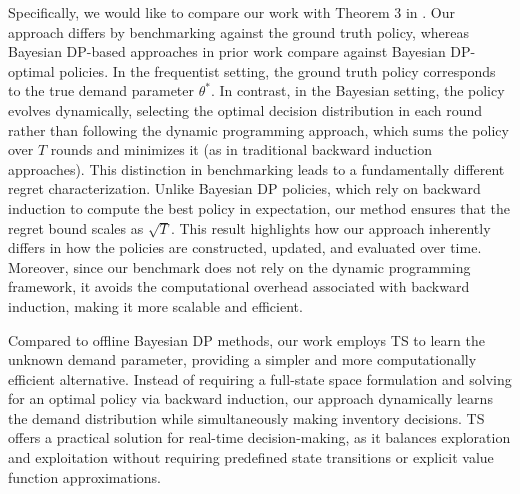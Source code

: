 Specifically, we would like to compare our work with Theorem 3 in \cite{besbes2022exploration}. Our approach differs by benchmarking against the ground truth policy, whereas Bayesian DP-based approaches in prior work compare against Bayesian DP-optimal policies. In the frequentist setting, the ground truth policy corresponds to the true demand parameter \( \theta^* \). In contrast, in the Bayesian setting, the policy evolves dynamically, selecting the optimal decision distribution in each round rather than following the dynamic programming approach, which sums the policy over \(T\) rounds and minimizes it (as in traditional backward induction approaches). This distinction in benchmarking leads to a fundamentally different regret characterization. Unlike Bayesian DP policies, which rely on backward induction to compute the best policy in expectation, our method ensures that the regret bound scales as \( \sqrt{T} \). This result highlights how our approach inherently differs in how the policies are constructed, updated, and evaluated over time. Moreover, since our benchmark does not rely on the dynamic programming framework, it avoids the computational overhead associated with backward induction, making it more scalable and efficient.

Compared to offline Bayesian DP methods, our work employs TS to learn the unknown demand parameter, providing a simpler and more computationally efficient alternative. Instead of requiring a full-state space formulation and solving for an optimal policy via backward induction, our approach dynamically learns the demand distribution while simultaneously making inventory decisions. TS offers a practical solution for real-time decision-making, as it balances exploration and exploitation without requiring predefined state transitions or explicit value function approximations. %


